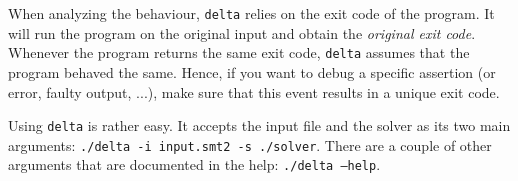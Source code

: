 When analyzing the behaviour, \texttt{delta} relies on the exit code of the program.
It will run the program on the original input and obtain the \emph{original exit code}.
Whenever the program returns the same exit code, \texttt{delta} assumes that the program behaved the same.
Hence, if you want to debug a specific assertion (or error, faulty output, ...), make sure that this event results in a unique exit code.

Using \texttt{delta} is rather easy.
It accepts the input file and the solver as its two main arguments: \texttt{./delta -i input.smt2 -s ./solver}.
There are a couple of other arguments that are documented in the help: \texttt{./delta --help}.
